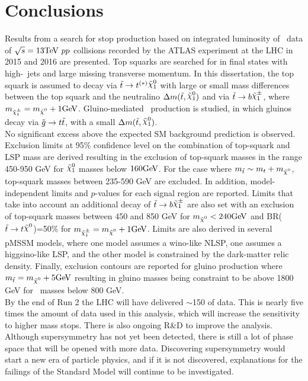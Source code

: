 \chapter{Conclusions}
\label{ch:conclusion}


Results from a search for stop production based
on integrated luminosity of \lumi\ data of $\rts = 13 \tev ~pp$ 
collisions recorded by the ATLAS experiment at the LHC in 2015 and
2016 are presented. Top squarks are searched for in
final states with high-\pT\ jets and large missing transverse
momentum. In this dissertation, the top squark is assumed to decay via $\stop
\rightarrow t^{(*)} \ninoone$ with large or small mass differences between the top squark and the neutralino $\Delta
m(\stop,\ninoone)$ and via $\stop\to b \chinoonepm$, where $m_{\chinoonepm}=\mLSP+1\gev$. 
Gluino-mediated \stop\ production is
studied, in which gluinos decay via $\tilde{g}\rightarrow t\tilde{t}$, with a
small $\Delta m(\stop,\ninoone)$. \\

No significant excess above the expected SM background prediction is observed. Exclusion limits at 95\% confidence level on the combination of top-squark and LSP mass are derived resulting in the exclusion of top-squark masses in the range 450-950 GeV for $\ninoone$ masses below $160\GeV$. For the case where $\mstop\sim m_t+\mLSP$, top-squark masses between 235-590 GeV are excluded. In addition, model-independent limits and $p$-values for each signal region are reported. Limits that take into account an additional decay of $\stop\to b \chinoonepm$ are also set with an exclusion of top-squark masses between 450 and 850 GeV for $\mLSP<240\gev$ and BR($\stop\to t \LSP$)=50\% for $m_{\chinoonepm}=\mLSP+1\gev$. Limits are also derived in several pMSSM models, where one model assumes a wino-like NLSP, one assumes a higgsino-like LSP, and the other model is constrained by the dark-matter relic density.  Finally, exclusion contours are reported for gluino production where $\mstop=\mLSP+5\gev$ resulting in gluino masses being constraint to be above 1800 GeV for \stop\ masses below 800 GeV. \\

By the end of Run 2 the LHC will have delivered $\sim$150 \ifb of data.  This is nearly five times the amount of data used in this analysis, which will increase the sensitivity to higher mass stops.  There is also ongoing R\&D to improve the analysis.  Although supersymmetry has not yet been detected, there is still a lot of phase space that will be opened with more data.  Discovering supersymmetry would start a new era of particle physics, and if it is not discovered, explanations for the failings of the Standard Model will continue to be investigated.  


